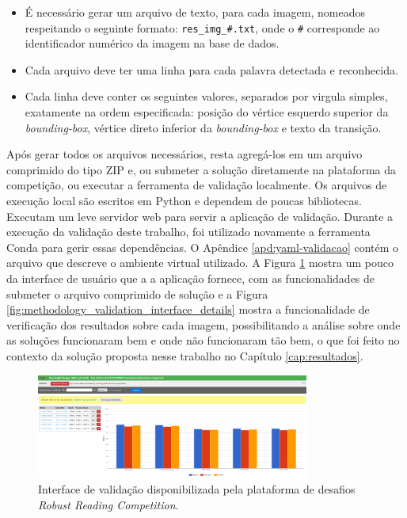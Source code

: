 \begin{itemize}
    \item É necessário gerar um arquivo de texto, para cada imagem, nomeados respeitando o seguinte formato: \texttt{res\_img\_\#.txt}, onde o \texttt{\#} corresponde ao identificador numérico da imagem na base de dados.
    \item Cada arquivo deve ter uma linha para cada palavra detectada e reconhecida.
    \item Cada linha deve conter os seguintes valores, separados por virgula simples, exatamente na ordem especificada: posição do vértice esquerdo superior da \textit{bounding-box}, vértice direto inferior da \textit{bounding-box} e texto da transição.
\end{itemize}

Após gerar todos os arquivos necessários, resta agregá-los em um arquivo comprimido do tipo ZIP e, ou submeter a solução diretamente na plataforma da competição, ou executar a ferramenta de validação localmente. Os arquivos de execução local são escritos em Python e dependem de poucas bibliotecas. Executam um leve servidor web para servir a aplicação de validação. Durante a execução da validação deste trabalho, foi utilizado novamente a ferramenta Conda para gerir essas dependências. O Apêndice \ref{apd:yaml-validacao} contém o arquivo que descreve o ambiente virtual utilizado. A Figura \ref{fig:methodology_validation_interface} mostra um pouco da interface de usuário que a a aplicação fornece, com as funcionalidades de submeter o arquivo comprimido de solução e a Figura \ref{fig:methodology_validation_interface_details} mostra a funcionalidade de verificação dos resultados sobre cada imagem, possibilitando a análise sobre onde as soluções funcionaram bem e onde não funcionaram tão bem, o que foi feito no contexto da solução proposta nesse trabalho no Capítulo \ref{cap:resultados}.

\begin{figure}
    \centering
    \includegraphics[width=0.8\textwidth]{figs/metodologia-interface-validacao.png}
    \caption{Interface de validação disponibilizada pela plataforma de desafios \textit{Robust Reading Competition}.}
    \label{fig:methodology_validation_interface}
\end{figure}

